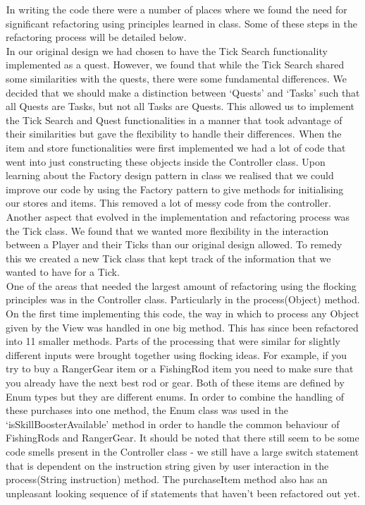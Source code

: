 \documentclass[letter paper, 12pt]{article}
\newcommand{\tab}{${}_{}$\hspace{0.2in}}
\begin{document}
\tab In writing the code there were a number of places where we found the need for significant refactoring using principles learned in class. Some of these steps in the refactoring process will be detailed below.\\
\tab In our original design we had chosen to have the Tick Search functionality implemented as a quest. However, we found that while the Tick Search shared some similarities with the quests, there were some fundamental differences. We decided that we should make a distinction between `Quests' and `Tasks' such that all Quests are Tasks, but not all Tasks are Quests. This allowed us to implement the Tick Search and Quest functionalities in a manner that took advantage of their similarities but gave the flexibility to handle their differences.
\tab When the item and store functionalities were first implemented we had a lot of code that went into just constructing these objects inside the Controller class. Upon learning about the Factory design pattern in class we realised that we could improve our code by using the Factory pattern to give methods for initialising our stores and items. This removed a lot of messy code from the controller.\\
\tab Another aspect that evolved in the implementation and refactoring process was the Tick class. We found that we wanted more flexibility in the interaction between a Player and their Ticks than our original design allowed. To remedy this we created a new Tick class that kept track of the information that we wanted to have for a Tick.\\
\tab One of the areas that needed the largest amount of refactoring using the flocking principles was in the Controller class. Particularly in the process(Object) method. On the first time implementing this code, the way in which to process any Object given by the View was handled in one big method. This has since been refactored into 11 smaller methods. Parts of the processing that were similar for slightly different inputs were brought together using flocking ideas. For example, if you try to buy a RangerGear item or a FishingRod item you need to make sure that you already have the next best rod or gear. Both of these items are defined by Enum types but they are different enums. In order to combine the handling of these purchases into one method, the Enum class was used in the `isSkillBoosterAvailable' method in order to handle the common behaviour of FishingRods and RangerGear. It should be noted that there still seem to be some code smells present in the Controller class - we still have a large switch statement that is dependent on the instruction string given by user interaction in the process(String instruction) method. The purchaseItem method also has an unpleasant looking sequence of if statements that haven't been refactored out yet.\\
\end{document}
